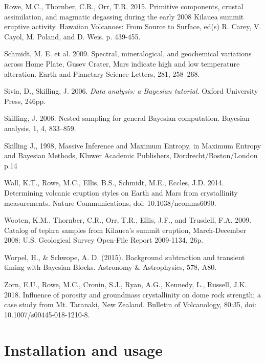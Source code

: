 \documentclass[review]{elsarticle}
\newcommand{\changed}{\color{blue}}
\begin{document}
\begin{thebibliography}{99}
Rowe, M.C., Thornber, C.R., Orr, T.R. 2015. Primitive components, crustal assimilation, and magmatic degassing during the early 2008 Kilauea summit eruptive activity. Hawaiian Volcanoes: From Source to Surface, ed(s) R. Carey, V. Cayol, M. Poland, and D. Weis. p. 439-455.

Schmidt, M. E. et al. 2009. Spectral, mineralogical, and geochemical variations across Home Plate, Gusev Crater, Mars indicate high and low temperature alteration. Earth and Planetary Science Letters, 281, 258–268.

Sivia, D., Skilling, J. 2006.
\newblock \emph{Data analysis: a Bayesian tutorial}.
\newblock Oxford University Press, 246pp.

{\changed 
{}
Skilling, J. 2006. Nested sampling for general Bayesian computation.
Bayesian analysis, 1, 4, 833--859.

Skilling J., 1998, Massive Inference and Maximum Entropy, in Maximum Entropy
and Bayesian Methods, Kluwer Academic Publishers, Dordrecht/Boston/London p.14
}

Wall, K.T., Rowe, M.C., Ellis, B.S., Schmidt, M.E., Eccles, J.D. 2014. Determining volcanic eruption styles on Earth and Mars from crystallinity measurements. Nature Communications, doi: 10.1038/ncomms6090.

Wooten, K.M., Thornber, C.R., Orr, T.R., Ellis, J.F., and Trusdell, F.A. 2009. Catalog of tephra samples from Kilauea's summit eruption, March-December 2008: U.S. Geological Survey Open-File Report 2009-1134, 26p.

{\changed 
{}
Worpel, H., \& Schwope, A. D. (2015). Background subtraction and transient timing with Bayesian Blocks. Astronomy \& Astrophysics, 578, A80.
}

Zorn, E.U., Rowe, M.C., Cronin, S.J., Ryan, A.G., Kennedy, L., Russell, J.K. {\changed 2018}. Influence of porosity and groundmass crystallinity on dome rock strength; a case study from Mt. Taranaki, New Zealand. Bulletin of Volcanology, 80:35, doi: 10.1007/s00445-018-1210-8.

\end{thebibliography}

\appendix
\section{Installation and usage}\label{sec:program}
\end{document}
